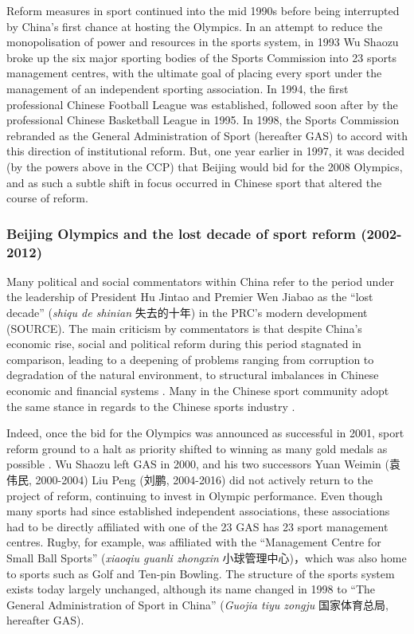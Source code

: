 {Reform measures in sport continued into the mid 1990s before being interrupted by China's first chance at hosting the Olympics.  In an attempt to reduce the monopolisation of power and resources in the sports system, in 1993 Wu Shaozu broke up the six major sporting bodies of the Sports Commission into 23 sports management centres, with the ultimate goal of placing every sport under the management of an independent sporting association.  In 1994, the first professional Chinese Football League was established, followed soon after by the professional Chinese Basketball League in 1995.  In 1998, the Sports Commission rebranded as the General Administration of Sport (hereafter GAS) to accord with this direction of institutional reform.  But, one year earlier in 1997, it was decided (by the powers above in the CCP) that Beijing would bid for the 2008 Olympics, and as such a subtle shift in focus occurred in Chinese sport that altered the course of reform.


\subsubsection{Beijing Olympics and the lost decade of sport reform (2002-2012)}

Many political and social commentators within China refer to the period under the leadership of President Hu Jintao and Premier Wen Jiabao as the ``lost decade'' (\textit{shiqu de shinian} 失去的十年) in the PRC's modern development (SOURCE). The main criticism by commentators is that despite China's economic rise, social and political reform during this period stagnated in comparison, leading to a deepening of problems ranging from corruption to degradation of the natural environment, to structural imbalances in Chinese economic and financial systems \citep{Barme2014}.  Many in the Chinese sport community adopt the same stance in regards to the Chinese sports industry \citep{News2017}.

Indeed, once the bid for the Olympics was announced as successful in 2001, sport reform ground to a halt as priority shifted to winning as many gold medals as possible \citep{News2017}.  Wu Shaozu left GAS in 2000, and his two successors Yuan Weimin (袁伟民, 2000-2004) Liu Peng (刘鹏, 2004-2016) did not actively return to the project of reform, continuing to invest in Olympic performance.  Even though many sports had since established independent associations, these associations had to be directly affiliated with one of the 23 GAS has 23 sport management centres. Rugby, for example, was affiliated with the ``Management Centre for Small Ball Sports'' (\textit{xiaoqiu guanli zhongxin} 小球管理中心)，which was also home to sports such as Golf and Ten-pin Bowling.  The structure of the sports system exists today largely unchanged, although its name changed in 1998 to ``The General Administration of Sport in China'' (\textit{Guojia tiyu zongju} 国家体育总局, hereafter GAS).

}

